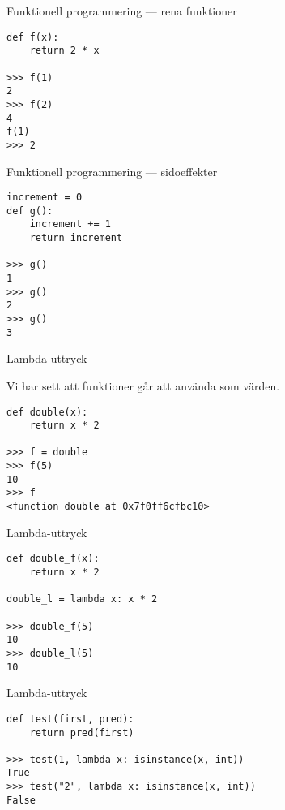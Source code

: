 \documentclass{beamer}
\begin{document}
  \begin{frame}[fragile]{Funktionell programmering --- rena funktioner}

    \begin{lstlisting}
def f(x):
    return 2 * x

>>> f(1)
2
>>> f(2)
4
f(1)
>>> 2
    \end{lstlisting}

  \end{frame}

  \begin{frame}[fragile]{Funktionell programmering --- sidoeffekter}

    \begin{lstlisting}
increment = 0
def g():
    increment += 1
    return increment

>>> g()
1
>>> g()
2
>>> g()
3
    \end{lstlisting}

  \end{frame}

  \begin{frame}[fragile]{Lambda-uttryck}

    Vi har sett att funktioner går att använda som värden.

    \begin{lstlisting}
def double(x):
    return x * 2

>>> f = double
>>> f(5)
10
>>> f
<function double at 0x7f0ff6cfbc10>
    \end{lstlisting}

  \end{frame}

  \begin{frame}[fragile]{Lambda-uttryck}

    \begin{lstlisting}
def double_f(x):
    return x * 2

double_l = lambda x: x * 2

>>> double_f(5)
10
>>> double_l(5)
10
    \end{lstlisting}

  \end{frame}

  \begin{frame}[fragile]{Lambda-uttryck}

    \begin{lstlisting}
def test(first, pred):
    return pred(first)

>>> test(1, lambda x: isinstance(x, int))
True
>>> test("2", lambda x: isinstance(x, int))
False
    \end{lstlisting}

  \end{frame}
\end{document}
